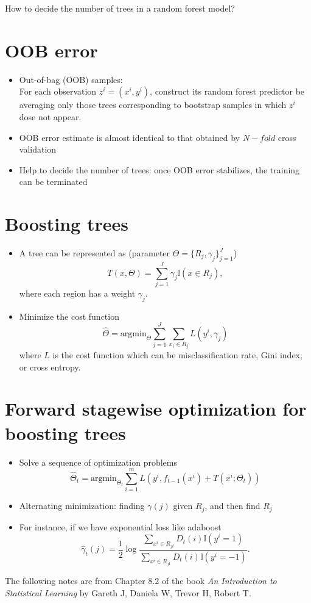 \documentclass[twoside,12pt]{article}
\begin{document}
How to decide the number of trees in a random forest model? 
\section{OOB error}
\begin{itemize}
\item Out-of-bag (OOB) samples:\\
For each observation $z^i = (x^i, y^i)$, construct its random forest predictor be averaging only those trees corresponding to bootstrap samples in which $z^i$ dose not appear.

\item OOB error estimate is almost identical to that obtained by $N-fold$ cross validation
\item Help to decide the number of trees: once OOB error stabilizes, the training can be terminated
\end{itemize}

\section{Boosting trees}
\begin{itemize}
\item A tree can be represented as (parameter $\Theta = \{R_j, \gamma_j\}_{j=1}^J$)
$$T(x, \Theta) = \sum_{j=1}^J \gamma_j \mathbb{I}( x\in R_j),$$
where each region has a weight $\gamma_j$. 
\item Minimize the cost function $$\hat{\Theta} = \text{argmin}_{\Theta} \sum_{j=1}^J \sum_{x_i \in R_j} L(y^i, \gamma_j)$$
where $L$ is the cost function which can be misclassification rate, Gini index, or cross entropy. 

\end{itemize}

\section{Forward stagewise optimization for boosting trees}
\begin{itemize}
\item Solve a sequence of optimization problems
$$\hat{\Theta}_t = \text{argmin}_{\Theta_t} \sum_{i=1}^m L(y^i, f_{t-1}(x^i) + T(x^i; \Theta_t))$$
\item Alternating minimization: finding $\gamma(j)$ given $R_j$, and then find $R_j$
\item For instance, if we have exponential loss like adaboost
$$\hat{\gamma}_t(j) = \frac 1 2 \log \frac{\sum_{x^i \in R_{jt} }D_t(i) \mathbb{I}(y^i = 1)}{\sum_{x^i \in R_{jt} }D_t(i) \mathbb{I}(y^i = -1)}.$$
\end{itemize}
The following notes are from Chapter 8.2 of the book \textit{An Introduction to Statistical Learning} by Gareth J, Daniela W, Trevor H, Robert T. \\
\end{document}
